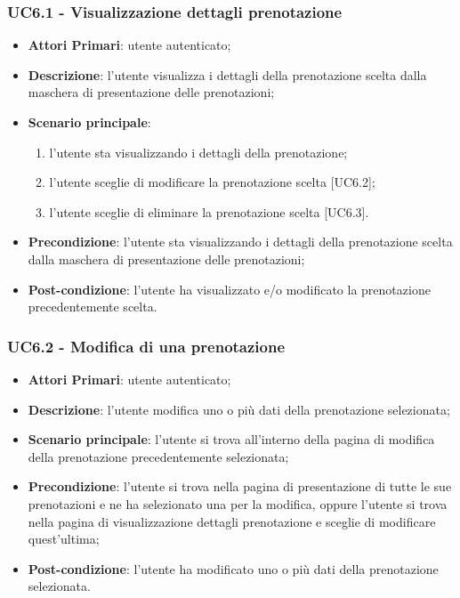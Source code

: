  \subsubsection{UC6.1 - Visualizzazione dettagli prenotazione}
\begin{itemize}
	\item \textbf{Attori Primari}: utente autenticato;
	\item \textbf{Descrizione}: l'utente visualizza i dettagli della prenotazione scelta dalla maschera di presentazione delle prenotazioni;
	\item \textbf{Scenario principale}:
	\begin{enumerate}[label=\alph*.]
		\item l'utente sta visualizzando i dettagli della prenotazione;
		\item l'utente sceglie di modificare la prenotazione scelta [UC6.2];
		\item l'utente sceglie di eliminare la prenotazione scelta [UC6.3].
	\end{enumerate}
	\item \textbf{Precondizione}: l'utente sta visualizzando i dettagli della prenotazione scelta dalla maschera di presentazione delle prenotazioni;
	\item \textbf{Post-condizione}: l'utente ha visualizzato e/o modificato la prenotazione precedentemente scelta.
\end{itemize}

\subsubsection{UC6.2 - Modifica di una prenotazione}
\begin{itemize}
	\item \textbf{Attori Primari}: utente autenticato;
	\item \textbf{Descrizione}: l'utente modifica uno o più dati della prenotazione selezionata;
	\item \textbf{Scenario principale}: l'utente si trova all'interno della pagina di modifica della prenotazione precedentemente selezionata;
	\item \textbf{Precondizione}: l'utente si trova nella pagina di presentazione di tutte le sue prenotazioni e ne ha selezionato una per la modifica, oppure l'utente si trova nella pagina di visualizzazione dettagli prenotazione e sceglie di modificare quest'ultima;
	\item \textbf{Post-condizione}: l'utente ha modificato uno o più dati della prenotazione selezionata.
\end{itemize}


